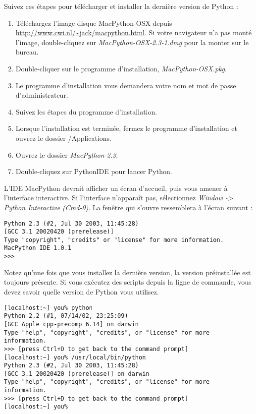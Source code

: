 Suivez ces étapes pour télécharger et installer la dernière version de Python :

\begin{enumerate}
    \item{Téléchargez l'image disque MacPython-OSX depuis \url{http://www.cwi.nl/~jack/macpython.html}. Si votre navigateur n'a pas monté l'image, double-cliquez sur \emph{MacPython-OSX-2.3-1.dmg} pour la monter sur le bureau.}
    \item{Double-cliquer sur le programme d'installation, \emph{MacPython-OSX.pkg}.}
    \item{Le programme d'installation vous demandera votre nom et mot de passe d'administrateur.}
    \item{Suivez les étapes du programme d'installation.}
    \item{Lorsque l'installation est terminée, fermez le programme d'installation et ouvrez le dossier /Applications.}
    \item{Ouvrez le dossier \emph{MacPython-2.3}.}
    \item{Double-cliquez sur PythonIDE pour lancer Python.}
\end{enumerate}

\medskip
L'IDE MacPython devrait afficher un écran d'accueil, puis vous amener à l'interface interactive. Si l'interface n'apparaît pas, sélectionnez \emph{Window -> Python Interactive (Cmd-0)}. La fenêtre qui s'ouvre ressemblera à l'écran suivant :

\begin{lstlisting}[style=none]
Python 2.3 (#2, Jul 30 2003, 11:45:28)
[GCC 3.1 20020420 (prerelease)]
Type "copyright", "credits" or "license" for more information.
MacPython IDE 1.0.1
>>>
\end{lstlisting}

Notez qu'une fois que vous installez la dernière version, la version préinstallée est toujours présente. Si vous exécutez des scripts depuis la ligne de commande, vous devez savoir quelle version de Python vous utilisez.

\begin{example}
\begin{lstlisting}[style=none]
[localhost:~] you% python
Python 2.2 (#1, 07/14/02, 23:25:09)
[GCC Apple cpp-precomp 6.14] on darwin
Type "help", "copyright", "credits", or "license" for more information.
>>> [press Ctrl+D to get back to the command prompt]
[localhost:~] you% /usr/local/bin/python
Python 2.3 (#2, Jul 30 2003, 11:45:28)
[GCC 3.1 20020420 (prerelease)] on darwin
Type "help", "copyright", "credits", or "license" for more information.
>>> [press Ctrl+D to get back to the command prompt]
[localhost:~] you%
\end{lstlisting}
\end{example}

